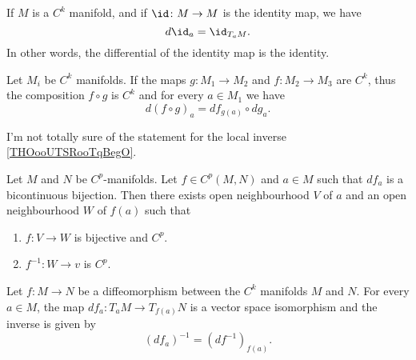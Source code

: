\begin{lemma}       \label{LEMooEGITooXbAPDe}
	If \( M\) is a \( C^k\) manifold, and if \( \id\colon M\to M\) is the identity map, we have
	\begin{equation}
		d\id_a=\id_{T_aM}.
	\end{equation}
	In other words, the differential of the identity map is the identity.
\end{lemma}

\begin{lemma}       \label{LEMooGRRAooXxDMuw}
	Let \( M_i\) be \( C^k\) manifolds. If the maps \( g\colon M_1\to M_2\) and \( f\colon M_2\to M_3 \) are \( C^k\), thus the composition \( f\circ g\) is \( C^k\) and for every \( a\in M_1\) we have
	\begin{equation}
		d(f\circ g)_a=df_{g(a)}\circ dg_a.
	\end{equation}
\end{lemma}

\begin{probleme}	\label{PROBooIRONooNAYXjo}
	I'm not totally sure of the statement for the local inverse \ref{THOooUTSRooTqBegO}.
\end{probleme}

\begin{theorem}	\label{THOooUTSRooTqBegO}
	Let \( M\) and \( N\) be \( C^p\)-manifolds. Let \( f\in C^p(M,N)\) and \( a\in M\) such that \( df_a\) is a bicontinuous bijection. Then there exists open neighbourhood \( V\) of \( a\) and an open neighbourhood \( W\) of \( f(a)\) such that
	\begin{enumerate}
		\item
		      \(f \colon V\to W  \) is bijective and \( C^p\).
		\item
		      \(f^{-1} \colon W\to v  \) is \( C^p\).
	\end{enumerate}
\end{theorem}



\begin{proposition}       \label{PROPooPEMLooPQcywG}
	Let \( f\colon M\to N\) be a diffeomorphism between the \( C^k\) manifolds \( M\) and \( N\). For every \( a\in M\), the map \( df_a\colon T_aM\to T_{f(a)}N\) is a vector space isomorphism and the inverse is given by
	\begin{equation}
		(df_a)^{-1}=(df^{-1})_{f(a)}.
	\end{equation}
\end{proposition}

